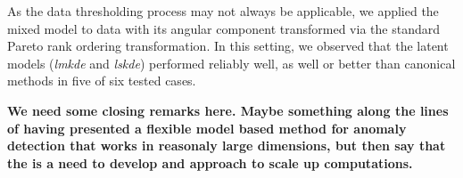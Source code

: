 As the data thresholding process may not always be applicable, 
    we applied the mixed model to data with its angular component 
    transformed via the standard Pareto rank ordering transformation. 
    In this setting, we observed that the latent models (\emph{lmkde} 
    and \emph{lskde}) performed reliably well, as well or better than
    canonical methods in five of six tested cases.

    {\bf We need some closing remarks here. Maybe something along the lines
    of having presented a flexible model based method for anomaly detection
    that works in reasonaly large dimensions, but then say that the is a need
    to develop and approach to scale up computations.}

